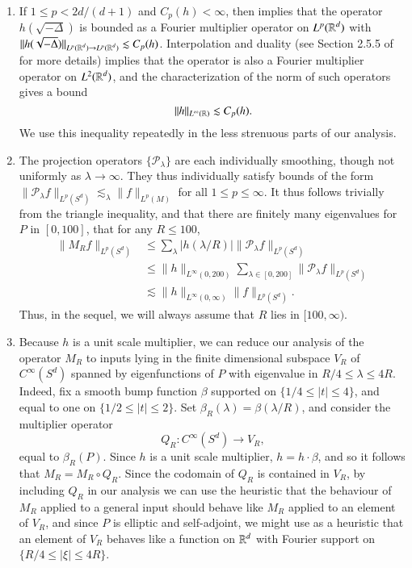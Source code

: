 \begin{remarks}
    \ 
\begin{enumerate}
    \item If $1 \leq p < 2d/(d+1)$ and $C_p(h) < \infty$, then \cite{HeoandNazarovandSeeger} implies that the operator $h(\sqrt{-\Delta})$ is bounded as a Fourier multiplier operator on $L^p(\operatorname{\mathbb{R}}^d)$ with $\| h(\sqrt{-\Delta}) \|_{L^p(\operatorname{\mathbb{R}}^d) \to L^p(\operatorname{\mathbb{R}}^d)} \lesssim C_p(h)$. Interpolation and duality (see Section 2.5.5 of \cite{Grafakos} for more details) implies that the operator is also a Fourier multiplier operator on $L^2(\operatorname{\mathbb{R}}^d)$, and the characterization of the norm of such operators gives a bound
    \[ \| h \|_{L^\infty(\operatorname{\mathbb{R}})} \lesssim C_p(h). \]
    We use this inequality repeatedly in the less strenuous parts of our analysis.

    \item The projection operators $\{ \mathcal{P}_\lambda \}$ are each individually smoothing, though not uniformly as $\lambda \to \infty$. They thus individually satisfy bounds of the form $\| \mathcal{P}_\lambda f \|_{L^p(S^d)} \lesssim_\lambda \| f \|_{L^p(M)}$ for all $1 \leq p \leq \infty$. It thus follows trivially from the triangle inequality, and that there are finitely many eigenvalues for $P$ in $[0,100]$, that for any $R \leq 100$,
    \begin{align*}
        \| M_R f \|_{L^p(S^d)} &\leq \sum_\lambda |h(\lambda/R)| \| \mathcal{P}_\lambda f \|_{L^p(S^d)}\\
        &\leq \| h \|_{L^\infty(0,200)} \sum\nolimits_{\lambda \in [0,200]} \| \mathcal{P}_\lambda f \|_{L^p(S^d)}\\
        &\lesssim \| h \|_{L^\infty(0,\infty)} \| f \|_{L^p(S^d)}.
    \end{align*}
    Thus, in the sequel, we will always assume that $R$ lies in $[100,\infty)$.

    \item Because $h$ is a unit scale multiplier, we can reduce our analysis of the operator $M_R$ to inputs lying in the finite dimensional subspace $V_R$ of $C^\infty(S^d)$ spanned by eigenfunctions of $P$ with eigenvalue in $R/4 \leq \lambda \leq 4R$. Indeed, fix a smooth bump function $\beta$ supported on $\{ 1/4 \leq |t| \leq 4 \}$, and equal to one on $\{ 1/2 \leq |t| \leq 2 \}$. Set $\beta_R(\lambda) = \beta(\lambda / R)$, and consider the multiplier operator
    \[ Q_R: C^\infty(S^d) \to V_R, \]
    equal to $\beta_R( P )$. Since $h$ is a unit scale multiplier, $h = h \cdot \beta$, and so it follows that $M_R = M_R \circ Q_R$. Since the codomain of $Q_R$ is contained in $V_R$, by including $Q_R$ in our analysis we can use the heuristic that the behaviour of $M_R$ applied to a general input should behave like $M_R$ applied to an element of $V_R$, and since $P$ is elliptic and self-adjoint, we might use as a heuristic that an element of $V_R$ behaves like a function on $\operatorname{\mathbb{R}}^d$ with Fourier support on $\{ R/4 \leq |\xi| \leq 4R \}$.


\end{enumerate}
\end{remarks}
